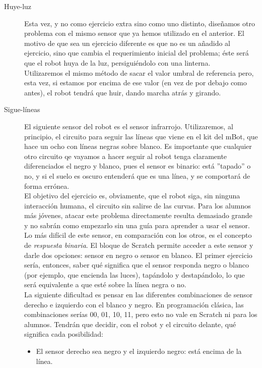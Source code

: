 \begin{description}
\item[Huye-luz]\label{ej:huyeLuz}
Esta vez, y no como ejercicio extra sino como uno distinto, diseñamos otro problema con el mismo sensor que ya hemos utilizado en el anterior. El motivo de que sea un ejercicio diferente es que no es un añadido al ejercicio, sino que cambia el requerimiento inicial del problema; éste será que el robot huya de la luz, persiguiéndolo con una linterna.\\
Utilizaremos el mismo método de sacar el valor umbral de referencia pero, esta vez, si estamos por encima de ese valor (en vez de por debajo como antes), el robot tendrá que huir, dando marcha atrás y girando.\\

\item[Sigue-líneas]\label{ej:sigueLineas}
El siguiente sensor del robot es el sensor infrarrojo.
Utilizaremos, al principio, el circuito para seguir las líneas que viene en el kit del mBot, que hace un ocho con líneas negras sobre blanco. Es importante que cualquier otro circuito qe vayamos a hacer seguir al robot tenga claramente diferenciados el negro y blanco, pues el sensor es binario: está ''tapado'' o no, y si el suelo es oscuro entenderá que es una línea, y se comportará de forma errónea.\\
El objetivo del ejercicio es, obviamente, que el robot siga, sin ninguna interacción humana, el circuito sin salirse de las curvas. Para los alumnos más jóvenes, atacar este problema directamente resulta demasiado grande y no sabrán como empezarlo sin una guía para aprender a usar el sensor. Lo más difícil de este sensor, en comparación con los otros, es el concepto de \textit{respuesta binaria}. El bloque de Scratch permite acceder a este sensor y darle dos opciones: sensor en negro o sensor en blanco. El primer ejercicio sería, entonces, saber qué significa que el sensor responda negro o blanco (por ejemplo, que encienda las luces), tapándolo y destapándolo, lo que será equivalente a que esté sobre la línea negra o no.\\
La siguiente dificultad es pensar en las diferentes combinaciones de sensor derecho e izquierdo con el blanco y negro. En programación clásica, las combinaciones serías 00, 01, 10, 11, pero esto no vale en Scratch ni para los alumnos. Tendrán que decidir, con el robot y el circuito delante, qué significa cada posibilidad:
\begin{itemize}
	\item El sensor derecho sea negro y el izquierdo negro: está encima de la línea.

\end{itemize}
\end{description}
